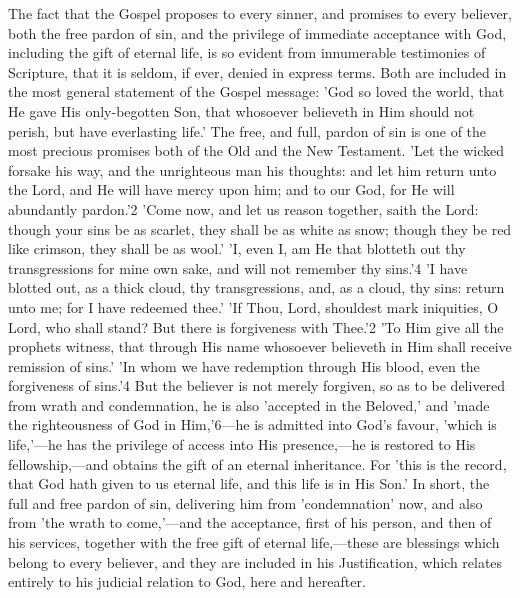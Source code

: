 \documentclass[
]{book}
\begin{document}
The fact that the Gospel proposes to every sinner, and promises to every believer, both the free pardon of sin, and the privilege of immediate acceptance with God, including the gift of eternal life, is so evident from innumerable testimonies of Scripture, that it is seldom, if ever, denied in express terms. Both are included in the most general statement of the Gospel message: 'God so loved the world, that He gave His only-begotten Son, that whosoever believeth in Him should not perish, but have everlasting life.' The free, and full, pardon of sin is one of the most precious promises both of the Old and the New Testament. 'Let the wicked forsake his way, and the unrighteous man his thoughts: and let him return unto the Lord, and He will have mercy upon him; and to our God, for He will abundantly pardon.'2 'Come now, and let us reason together, saith the Lord: though your sins be as scarlet, they shall be as white as snow; though they be red like crimson, they shall be as wool.' 'I, even I, am He that blotteth out thy transgressions for mine own sake, and will not remember thy sins.'4 'I have blotted out, as a thick cloud, thy transgressions, and, as a cloud, thy sins: return unto me; for I have redeemed thee.' 'If Thou, Lord, shouldest mark iniquities, O Lord, who shall stand? But there is forgiveness with Thee.'2 'To Him give all the prophets witness, that through His name whosoever believeth in Him shall receive remission of sins.' 'In whom we have redemption through His blood, even the forgiveness of sins.'4 But the believer is not merely forgiven, so as to be delivered from wrath and condemnation, he is also 'accepted in the Beloved,' and 'made the righteousness of God in Him,'6---he is admitted into God's favour, 'which is life,'---he has the privilege of access into His presence,---he is restored to His fellowship,---and obtains the gift of an eternal inheritance. For 'this is the record, that God hath given to us eternal life, and this life is in His Son.' In short, the full and free pardon of sin, delivering him from 'condemnation' now, and also from 'the wrath to come,'---and the acceptance, first of his person, and then of his services, together with the free gift of eternal life,---these are blessings which belong to every believer, and they are included in his Justification, which relates entirely to his judicial relation to God, here and hereafter.
\end{document}
